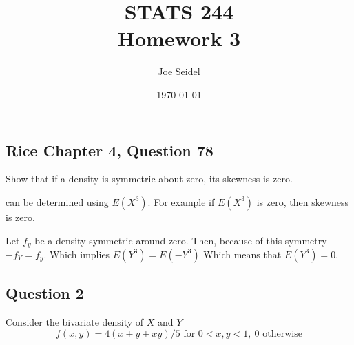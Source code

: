 \documentclass{tufte-book}
\title{STATS 244 \\ Homework 3}
\author{Joe Seidel}
\date{\today}
\theoremstyle{mytheoremstyle}
\theoremstyle{mylemstyle}
\theoremstyle{mydefstyle}
\begin{document}
\maketitle
{}
\newpage
{}

\subsection{Rice Chapter 4, Question 78}
Show that if a density is symmetric about zero, its skewness is zero.

 can be determined using $E(X^3)$.   For example if $E(X^3)$ is zero, then skewness is zero.

Let $f_y$ be a density symmetric around zero.  Then, because of this symmetry $-f_Y = f_y$.  Which implies $E(Y^3) = E(-Y^3)$  Which means that $E(Y^3)=0$.

\subsection{Question 2}
Consider the bivariate density of $X$ and $Y$
\[f(x,y) = 4(x+y+xy)/5 \text{ for } 0< x,y <1 ,\ 0 \text{ otherwise} \]
\end{document}
